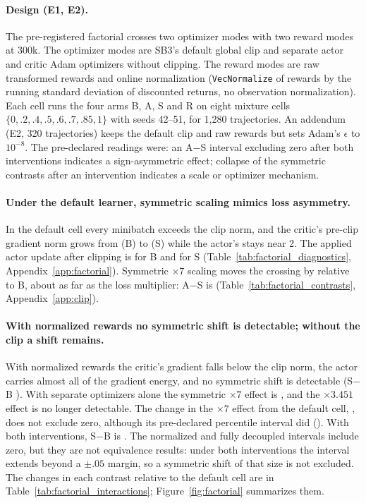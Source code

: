

\paragraph{Design (E1, E2).}
The pre-registered factorial crosses two optimizer modes with two reward modes at 300k. The optimizer
modes are SB3's default global clip and separate actor and critic Adam optimizers without clipping. The
reward modes are raw transformed rewards and online normalization (\texttt{VecNormalize} of rewards by
the running standard deviation of discounted returns, no observation normalization). Each cell runs the
four arms B, A, S and R on eight mixture cells $\{0,.2,.4,.5,.6,.7,.85,1\}$ with seeds 42--51, for
1,280 trajectories. An addendum (E2, 320 trajectories) keeps the default clip and raw rewards but sets
Adam's $\epsilon$ to $10^{-8}$. The pre-declared readings were: an A$-$S interval excluding zero after
both interventions indicates a sign-asymmetric effect; collapse of the symmetric contrasts after an
intervention indicates a scale or optimizer mechanism.

\paragraph{Under the default learner, symmetric scaling mimics loss asymmetry.}
In the default cell every minibatch exceeds the clip norm, and the critic's pre-clip gradient norm
grows from \VfourCriticNormB{} (B) to \VfourCriticNormS{} (S) while the actor's stays near 2. The applied
actor update after clipping is \VfourAppliedActorB{} for B and \VfourAppliedActorS{} for S
(Table~\ref{tab:factorial_diagnostics}, Appendix~\ref{app:factorial}). Symmetric $\times7$ scaling moves the crossing by
\VfourSymStd{} relative to B, about as far as the loss multiplier: A$-$S is
\VfourAsymStd{} (Table~\ref{tab:factorial_contrasts}, Appendix~\ref{app:clip}).

\paragraph{With normalized rewards no symmetric shift is detectable; without the clip a shift remains.}
With normalized rewards the critic's gradient falls below the clip norm, the actor carries almost all
of the gradient energy, and no symmetric shift is detectable (S$-$B \VfourSymNorm{}). With separate
optimizers alone the symmetric $\times7$ effect is \VfourSymSep{}, and the $\times3.451$ effect is
no longer detectable. The change in the $\times7$ effect from the default cell, \VfourSymSepChange{}, does not exclude
zero, although its pre-declared percentile interval did (\VfourSymSepChangePct{}). With both interventions, S$-$B is \VfourSymBoth{}. The normalized and fully decoupled intervals include zero, but
they are not equivalence results: under both interventions the interval extends beyond a $\pm.05$ margin, so
a symmetric shift of that size is not excluded. The changes in each contrast relative to the default cell are
in Table~\ref{tab:factorial_interactions}; Figure~\ref{fig:factorial} summarizes them.

